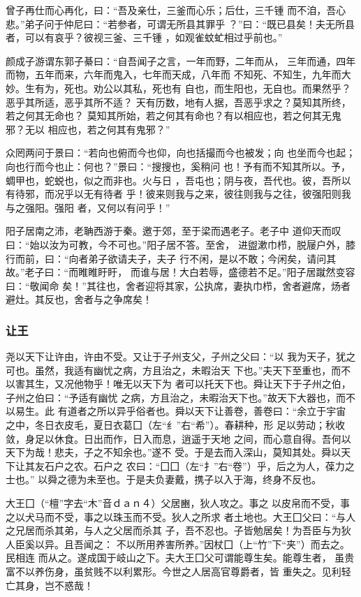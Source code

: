 \documentclass[]{article}
\begin{document}
曾子再仕而心再化，曰：``吾及亲仕，三釜而心乐；后仕，三千锺
而不洎，吾心悲。''弟子问于仲尼曰：``若参者，可谓无所县其罪乎
？''曰：``既已县矣！夫无所县者，可以有哀乎？彼视三釜、三千锺
，如观雀蚊虻相过乎前也。''

颜成子游谓东郭子綦曰：``自吾闻子之言，一年而野，二年而从，
三年而通，四年而物，五年而来，六年而鬼入，七年而天成，八年而
不知死、不知生，九年而大妙。生有为，死也。劝公以其私，死也有
自也，而生阳也，无自也。而果然乎？恶乎其所适，恶乎其所不适？
天有历数，地有人据，吾恶乎求之？莫知其所终，若之何其无命也？
莫知其所始，若之何其有命也？有以相应也，若之何其无鬼邪？无以
相应也，若之何其有鬼邪？''

众罔两问于景曰：``若向也俯而今也仰，向也括撮而今也被发；向
也坐而今也起；向也行而今也止：何也？''景曰：``搜搜也，奚稍问
也！予有而不知其所以。予，蜩甲也，蛇蜕也，似之而非也。火与日
，吾屯也；阴与夜，吾代也。彼，吾所以有待邪，而况乎以无有待者
乎！彼来则我与之来，彼往则我与之往，彼强阳则我与之强阳。强阳
者，又何以有问乎！''

阳子居南之沛，老聃西游于秦。邀于郊，至于梁而遇老子。老子中
道仰天而叹曰：``始以汝为可教，今不可也。''阳子居不答。至舍，
进盥漱巾栉，脱屦户外，膝行而前，曰：``向者弟子欲请夫子，夫子
行不闲，是以不敢；今闲矣，请问其故。''老子曰：``而睢睢盱盱，
而谁与居！大白若辱，盛德若不足。''阳子居蹴然变容曰：``敬闻命
矣！''其往也，舍者迎将其家，公执席，妻执巾栉，舍者避席，炀者
避灶。其反也，舍者与之争席矣！

\hypertarget{header-n950}{%
\subsubsection{让王}\label{header-n950}}

尧以天下让许由，许由不受。又让于子州支父，子州之父曰：``以
我为天子，犹之可也。虽然，我适有幽忧之病，方且治之，未暇治天
下也。''夫天下至重也，而不以害其生，又况他物乎！唯无以天下为
者可以托天下也。舜让天下于子州之伯，子州之伯曰：``予适有幽忧
之病，方且治之，未暇治天下也。''故天下大器也，而不以易生。此
有道者之所以异乎俗者也。舜以天下让善卷，善卷曰：``余立于宇宙
之中，冬日衣皮毛，夏日衣葛囗（左``纟''右``希''）。春耕种，形
足以劳动；秋收敛，身足以休食。日出而作，日入而息，逍遥于天地
之间，而心意自得。吾何以天下为哉！悲夫，子之不知余也。''遂不
受。于是去而入深山，莫知其处。舜以天下让其友石户之农。石户之
农曰：``囗囗（左``扌''右``卷''）乎，后之为人，葆力之士也。''
以舜之德为未至也。于是夫负妻戴，携子以入于海，终身不反也。

大王囗（``檀''字去``木''音ｄａｎ４）父居豳，狄人攻之。事之
以皮帛而不受，事之以犬马而不受，事之以珠玉而不受。狄人之所求
者土地也。大王囗父曰：``与人之兄居而杀其弟，与人之父居而杀其
子，吾不忍也。子皆勉居矣！为吾臣与为狄人臣奚以异。且吾闻之：
不以所用养害所养。''因杖囗（上``竹''下``夹''）而去之。民相连
而从之。遂成国于岐山之下。夫大王囗父可谓能尊生矣。能尊生者，
虽贵富不以养伤身，虽贫贱不以利累形。今世之人居高官尊爵者，皆
重失之。见利轻亡其身，岂不惑哉！
\end{document}
